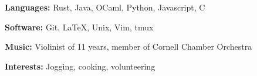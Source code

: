 \documentclass{resume}
\begin{document}
\begin{skills}
    \begin{description}
        \item \textbf{Languages:} Rust, Java, OCaml, Python, Javascript, C
        \item \textbf{Software:} Git, LaTeX, Unix, Vim, tmux
    \end{description}
    \begin{description}
        \item \textbf{Music:} Violinist of 11 years, member of Cornell Chamber Orchestra
        \item \textbf{Interests:} Jogging, cooking, volunteering
    \end{description}
\end{skills}
\end{document}
